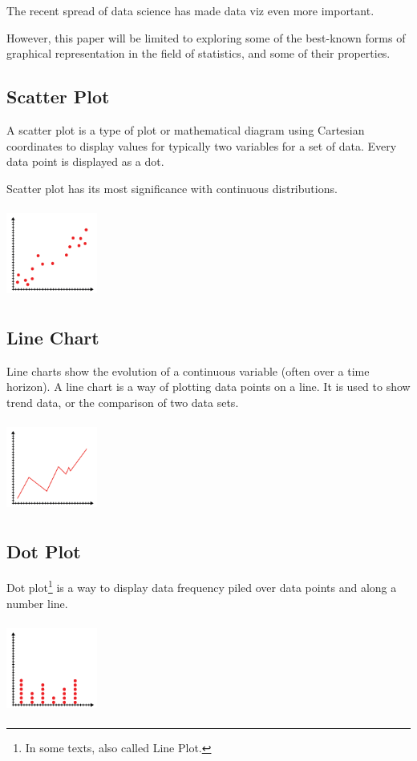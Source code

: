\documentclass{article}
\begin{document}
The recent spread of data science has made data viz even more important.

However, this paper will be limited to exploring some of the best-known forms of graphical representation in the field of statistics, and some of their properties.

\subsection{Scatter Plot}
A scatter plot is a type of plot or mathematical diagram using Cartesian coordinates to display values for typically two variables for a set of data. Every data point is displayed as a dot.

Scatter plot has its most significance with continuous distributions. 

\includegraphics[width=3cm, height=3cm]{plot_chart}

\subsection{Line Chart}
Line charts show the evolution of a continuous variable (often over a time horizon).
A line chart is a way of plotting data points on a line. 
It is used to show trend data, or the comparison of two data sets.

\includegraphics[width=3cm, height=3cm]{line_chart}

\subsection{Dot Plot}
Dot plot\footnote{In some texts, also called Line Plot.} is a way to display data frequency piled over data points and along a number line. 

\includegraphics[width=3cm, height=3cm]{dot_plot}
\end{document}

